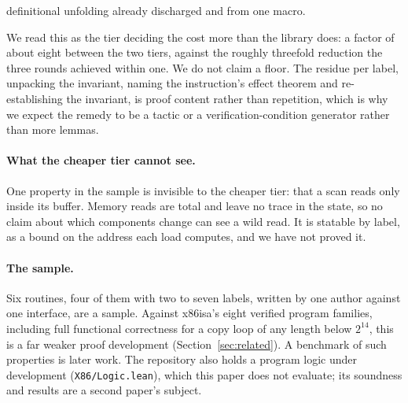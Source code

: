 \documentclass[runningheads]{llncs}
\newcommand{\src}[1]{}  %
\newcommand{\lean}[1]{\texttt{#1}}
\begin{document}
definitional unfolding already discharged and from one macro.
\src{docs/CLAIMS.tsv[fit\_labels\_fill, proof\_round\_1, proof\_round\_2, proof\_round\_3, proof\_round\_4]; docs/P2-PROOF-INTERFACE.md, the runP\_code point and round 4 (problem 1, the fill routine; this sentence said "the first of these routines", which in the list above is prologue, D234)}
We read this as the tier deciding the cost more than the library does: a factor of about eight between
the two tiers, against the roughly threefold reduction the three rounds achieved within one. We do
not claim a floor. The residue per label, unpacking the invariant, naming the instruction's effect
theorem and re-establishing the invariant, is proof content rather than repetition, which is why we
expect the remedy to be a tactic or a verification-condition generator rather than more lemmas.
\src{docs/P2-PROOF-INTERFACE.md round 4: the residue argument, stated as an argument}

\paragraph{What the cheaper tier cannot see.}
One property in the sample is invisible to the cheaper tier: that a scan reads only inside its buffer.
Memory reads are total and leave no trace in the state, so no claim about which components change can
see a wild read. It is statable by label, as a bound on the address each load computes, and we have not
proved it.
\src{docs/P2-PROOF-INTERFACE.md, problem 3 section 2 (the model records no read); X86/Program.lean runP\_invariant takes any I : Cpu -> Prop,
and runP fetches the instruction at rip from a fixed table, so a label-indexed address bound is a single-run invariant; Tests/Program.lean
has scan\_writes\_no\_memory and no read-bound theorem for the scan. This paragraph said until 2026-10-14 that the property could not
be a single-run invariant (Deep Review r2, F3)}

\paragraph{The sample.}
Six routines, four of them with two to seven labels, written by one author against one interface, are a sample.
Against x86isa's eight verified program families, including full functional correctness for a
copy loop of any length below $2^{14}$, this is a far weaker proof development (Section~\ref{sec:related}). A benchmark of such properties is later work. The repository also holds a program logic under development
(\lean{X86/Logic.lean}), which this paper does not evaluate; its soundness and results are a second paper's subject.
\src{docs/TACAS-PRICING.md 2.1 (the ruling) and G4; docs/TACAS-G1-POSITIONING.md 1c.2; docs/CLAIMS.tsv[proof\_sample\_routines, x86isa\_program\_families]; X86/Logic.lean, Tests/Logic*.lean and docs/P2-LOGIC-DESIGN.md are in the tree and not evaluated here}
\end{document}
